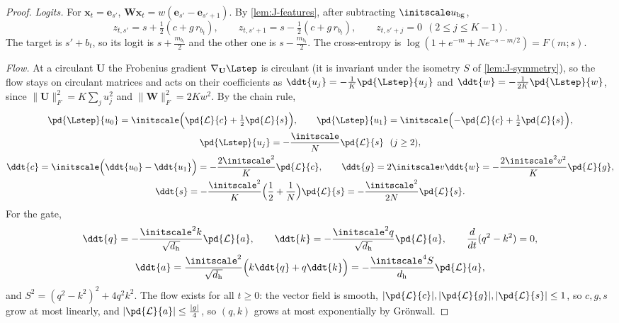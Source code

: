 \begin{proof}
\emph{Logits.} For $\bm x_t=\bm e_{s'}$, $\mathbf W\bm x_t=w(\bm e_{s'}-\bm e_{s'+1})$. By \cref{lem:J-features}, after subtracting $\initscale u_{\mathrm{bg}}$,
\[
 z_{t,s'}=s+\tfrac{1}{2}(c+g\,r_{b_t}),\qquad z_{t,s'+1}=s-\tfrac{1}{2}(c+g\,r_{b_t}),\qquad z_{t,s'+j}=0\ \ (2\le j\le K-1).
\]
The target is $s'+b_t$, so its logit is $s+\frac{m_{b_t}}{2}$ and the other one is $s-\frac{m_{b_t}}{2}$. The cross-entropy is
$\log(1+e^{-m}+Ne^{-s-m/2})=F(m;s)$.

\emph{Flow.} At a circulant $\mathbf U$ the Frobenius gradient $\nabla_{\mathbf U}\Lstep$ is circulant (it is invariant under the isometry $S$ of
\cref{lem:J-symmetry}), so the flow stays on circulant matrices and acts on their coefficients as $\ddt{u_j}=-\frac{1}{K}\pd{\Lstep}{u_j}$ and $\ddt{w}=-\frac{1}{2K}\pd{\Lstep}{w}$, since
$\|\mathbf U\|_F^2=K\sum_ju_j^2$ and $\|\mathbf W\|_F^2=2Kw^2$. By the chain rule,
\begin{gather*}
 \pd{\Lstep}{u_0}=\initscale\Bigl(\pd{\mathcal L}{c}+\tfrac{1}{2}\pd{\mathcal L}{s}\Bigr),\qquad \pd{\Lstep}{u_1}=\initscale\Bigl(-\pd{\mathcal L}{c}+\tfrac{1}{2}\pd{\mathcal L}{s}\Bigr),\\
 \pd{\Lstep}{u_j}=-\frac{\initscale}{N}\pd{\mathcal L}{s}\ \ (j\ge2),\\
 \ddt{c}=\initscale\Bigl(\ddt{u_0}-\ddt{u_1}\Bigr)=-\frac{2\initscale^2}{K}\pd{\mathcal L}{c},\qquad
 \ddt{g}=2\initscale v\ddt{w}=-\frac{2\initscale^2v^2}{K}\pd{\mathcal L}{g},\\
 \ddt{s}=-\frac{\initscale^2}{K}\Bigl(\frac{1}{2}+\frac{1}{N}\Bigr)\pd{\mathcal L}{s}=-\frac{\initscale^2}{2N}\pd{\mathcal L}{s}.
\end{gather*}
For the gate,
\begin{gather*}
 \ddt{q}=-\frac{\initscale^2k}{\sqrt{d_{\mathrm h}}}\pd{\mathcal L}{a},\qquad \ddt{k}=-\frac{\initscale^2q}{\sqrt{d_{\mathrm h}}}\pd{\mathcal L}{a},\qquad \frac{d}{dt}(q^2-k^2)=0,\\
 \ddt{a}=\frac{\initscale^2}{\sqrt{d_{\mathrm h}}}\Bigl(k\ddt{q}+q\ddt{k}\Bigr)=-\frac{\initscale^4S}{d_{\mathrm h}}\pd{\mathcal L}{a},
\end{gather*}
and $S^2=(q^2-k^2)^2+4q^2k^2$. The flow exists for all $t\ge0$: the vector field is smooth, $|\pd{\mathcal L}{c}|,|\pd{\mathcal L}{g}|,|\pd{\mathcal L}{s}|\le1$, so
$c,g,s$ grow at most linearly, and $|\pd{\mathcal L}{a}|\le\frac{|g|}{4}$, so $(q,k)$ grows at most exponentially by Gr\"onwall.
\end{proof}

